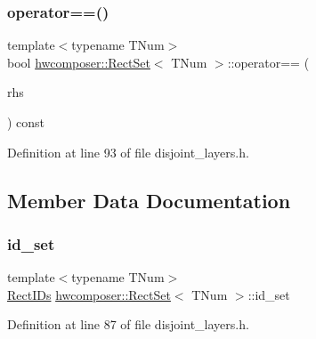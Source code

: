 \subsubsection{\texorpdfstring{operator==()}{operator==()}}
{\footnotesize\ttfamily template$<$typename T\+Num$>$ \\
bool \mbox{\hyperlink{structhwcomposer_1_1RectSet}{hwcomposer\+::\+Rect\+Set}}$<$ T\+Num $>$\+::operator== (\begin{DoxyParamCaption}\item[{const \mbox{\hyperlink{structhwcomposer_1_1RectSet}{Rect\+Set}}$<$ T\+Num $>$ \&}]{rhs }\end{DoxyParamCaption}) const\hspace{0.3cm}{\ttfamily [inline]}}



Definition at line 93 of file disjoint\+\_\+layers.\+h.


\begin{DoxyCode}{0}
\end{DoxyCode}


\subsection{Member Data Documentation}
\mbox{\label{structhwcomposer_1_1RectSet_ace46c21607523eca5345936ba743f28c}} 
\subsubsection{\texorpdfstring{id\+\_\+set}{id\_set}}
{\footnotesize\ttfamily template$<$typename T\+Num$>$ \\
\mbox{\hyperlink{structhwcomposer_1_1RectIDs}{Rect\+I\+Ds}} \mbox{\hyperlink{structhwcomposer_1_1RectSet}{hwcomposer\+::\+Rect\+Set}}$<$ T\+Num $>$\+::id\+\_\+set}



Definition at line 87 of file disjoint\+\_\+layers.\+h.

